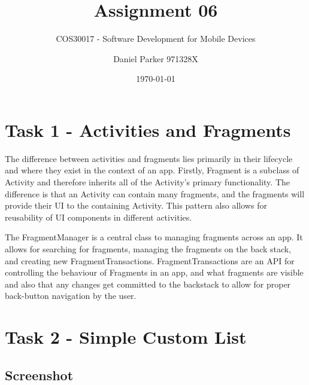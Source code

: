 \documentclass[11pt,english,numbers=endperiod,parskip=half]{scrartcl}
\title{Assignment 06}
\subtitle{COS30017 - Software Development for Mobile Devices}
\author{Daniel Parker 971328X}
\date{\today}
\begin{document}
\maketitle
\thispagestyle{empty}

\section{Task 1 - Activities and Fragments}
The difference between activities and fragments lies primarily in their lifecycle
and where they exist in the context of an app. Firstly, Fragment is a subclass
of Activity and therefore inherits all of the Activity's primary functionality.
The difference is that an Activity can contain many fragments, and the fragments
will provide their UI to the containing Activity. This pattern also allows for
reusability of UI components in different activities.

The FragmentManager is a central class to managing fragments across an app. It
allows for searching for fragments, managing the fragments on the back stack, and
creating new FragmentTransactions. FragmentTransactions are an API for controlling
the behaviour of Fragments in an app, and what fragments are visible and also that
any changes get committed to the backstack to allow for proper back-button navigation
by the user.

\section{Task 2 - Simple Custom List}

\subsection{Screenshot}
\setlength\fboxsep{0pt}
\setlength\fboxrule{0.5pt}

\begin{figure}[H]
\\
\end{figure}
\end{document}
